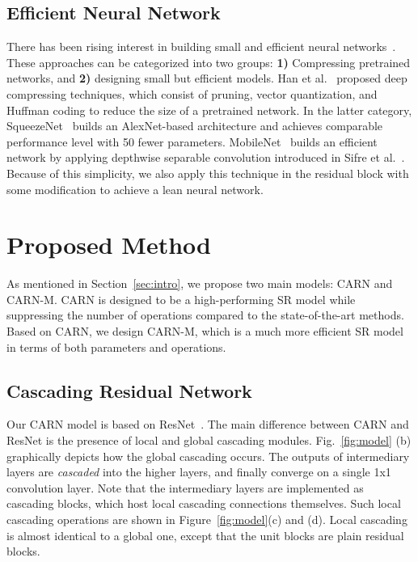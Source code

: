 \documentclass[runningheads]{llncs}
\begin{document}
\subsection{Efficient Neural Network}
\label{subsec:efficient_nn}
There has been rising interest in building small and efficient neural networks~\cite{squeezenet,han2015deep,mobilenets}. These approaches can be categorized into two groups: \textbf{1)} Compressing pretrained networks, and \textbf{2)} designing small but efficient models. Han et al.~\cite{han2015deep} proposed deep compressing techniques, which consist of pruning, vector quantization, and Huffman coding to reduce the size of a pretrained network. In the latter category, SqueezeNet~\cite{squeezenet} builds an AlexNet-based architecture and achieves comparable performance level with 50 fewer parameters. MobileNet~\cite{mobilenets} builds an efficient network by applying depthwise separable convolution introduced in Sifre et al.~\cite{dwconv}. Because of this simplicity, we also apply this technique in the residual block with some modification to achieve a lean neural network.

\section{Proposed Method}
\label{sec:method}
As mentioned in Section~\ref{sec:intro}, we propose two main models: CARN and CARN-M. CARN is designed to be a high-performing SR model while suppressing the number of operations compared to the state-of-the-art methods. Based on CARN, we design CARN-M, which is a much more efficient SR model in terms of both parameters and operations.

\subsection{Cascading Residual Network}
\label{subsec:carn}
Our CARN model is based on ResNet~\cite{resnet2016}. The main difference between CARN and ResNet is the presence of local and global cascading modules. Fig.~\ref{fig:model} (b) graphically depicts how the global cascading occurs. The outputs of intermediary layers are \textit{cascaded} into the higher layers, and finally converge on a single 1x1 convolution layer. Note that the intermediary layers are implemented as cascading blocks, which host local cascading connections themselves. Such local cascading operations are shown in Figure~\ref{fig:model}(c) and (d). Local cascading is almost identical to a global one, except that the unit blocks are plain residual blocks.
\end{document}
